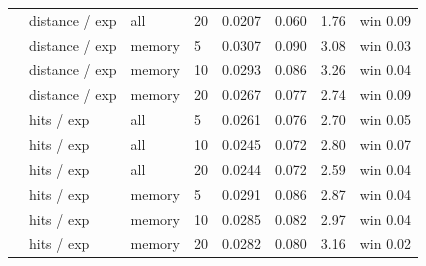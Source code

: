\begin{tabular}{llllcccc}
 & distance / exp & all & 20 & 0.0207 & 0.060 & 1.76 & win 0.09 \\
 & distance / exp & memory & 5 & 0.0307 & 0.090 & 3.08 & win 0.03 \\
 & distance / exp & memory & 10 & 0.0293 & 0.086 & 3.26 & win 0.04 \\
 & distance / exp & memory & 20 & 0.0267 & 0.077 & 2.74 & win 0.09 \\
 & hits / exp & all & 5 & 0.0261 & 0.076 & 2.70 & win 0.05 \\
 & hits / exp & all & 10 & 0.0245 & 0.072 & 2.80 & win 0.07 \\
 & hits / exp & all & 20 & 0.0244 & 0.072 & 2.59 & win 0.04 \\
 & hits / exp & memory & 5 & 0.0291 & 0.086 & 2.87 & win 0.04 \\
 & hits / exp & memory & 10 & 0.0285 & 0.082 & 2.97 & win 0.04 \\
 & hits / exp & memory & 20 & 0.0282 & 0.080 & 3.16 & win 0.02 \\
\bottomrule
\end{tabular}
